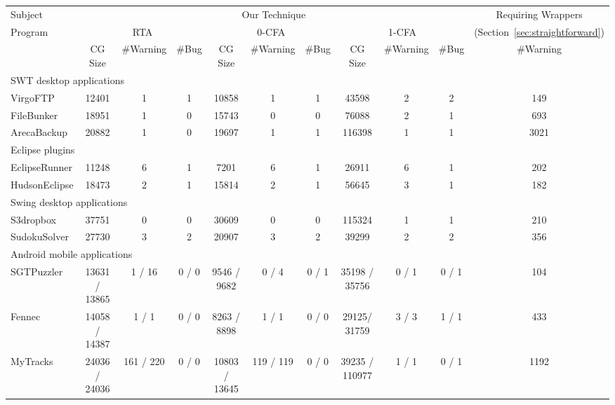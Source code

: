 \begin{table}[ht]
\begin{center}
 \fontsize{9pt}{\baselineskip}\selectfont
\hspace*{-0.2cm}
\setlength{\tabcolsep}{.15\tabcolsep}
\begin{tabular}{|l||c|c|c||c|c|c||c|c|c||c|}
\hline
 Subject&  \multicolumn{9}{|c||}{Our Technique} & Requiring Wrappers  \\
\cline{2-10}
 Program  &  \multicolumn{3}{|c||}{RTA }& \multicolumn{3}{|c||}{0-CFA } & \multicolumn{3}{|c||}{1-CFA } & (Section~\ref{sec:straightforward})  \\
\cline{2-11}
 & CG Size & \#Warning & \#Bug & CG Size & \#Warning & \#Bug & CG Size & \#Warning & \#Bug & \#Warning \\
\hline \hline
\multicolumn{11}{|l|}{SWT desktop applications}   \\
 \hline
 VirgoFTP&  12401 &  1 &  1 & 10858 & 1 & 1 & 43598 & 2 & 2& 149  \\
 \hline
 FileBunker &  18951 &  1 &  0 & 15743 & 0 & 0 & 76088 & 2 & 1& 693  \\
 \hline
 ArecaBackup&  20882 &  1  &  0 & 19697 & 1 & 1  & 116398 & 1 & 1 & 3021\\
 \hline
 \hline
\multicolumn{11}{|l|}{Eclipse plugins}   \\
 \hline
 EclipseRunner&  11248&  6 &  1 & 7201 & 6 & 1 & 26911 & 6 & 1& 202  \\
 \hline
 HudsonEclipse& 18473 &  2 &  1 & 15814 & 2 & 1& 56645 & 3 & 1 & 182 \\
 \hline
 \hline
\multicolumn{11}{|l|}{Swing desktop applications}   \\
 \hline
 S3dropbox & 37751 &  0 &  0 & 30609 & 0 & 0 & 115324 & 1 & 1 & 210  \\
 \hline
  SudokuSolver&  27730&  3 &  2 & 20907 & 3 & 2 & 39299 & 2 & 2 & 356  \\
 \hline
 \hline
\multicolumn{11}{|l|}{Android mobile applications}   \\
 \hline
 SGTPuzzler & 13631 / 13865&  1 / 16 &  0 / 0 & 9546 / 9682& 0 / 4& 0 / 1 & 35198 / 35756 & 0 / 1  & 0 / 1& 104 \\
 \hline
 Fennec & 14058 / 14387 &  1 / 1 &  0 / 0 & 8263 / 8898 & 1 / 1 & 0 / 0& 29125/ 31759 & 3 / 3 & 1 / 1& 433 \\
 \hline
 MyTracks & 24036 / 24036 &  161 / 220 & 0 / 0 & 10803 / 13645 & 119 / 119 & 0 / 0 & 39235 / 110977 & 1 / 1 & 0 / 1 & 1192 \\

\end{tabular}
\end{center}
\end{table}
